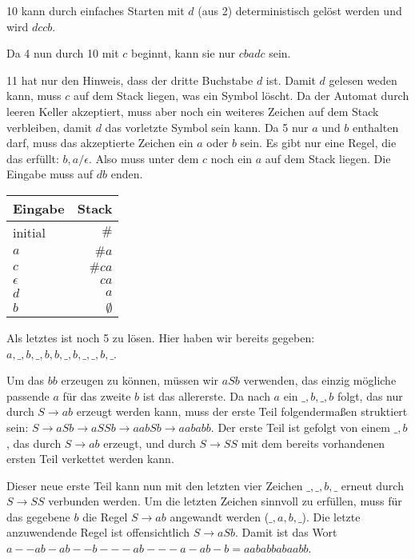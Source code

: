\documentclass{article}
\begin{document}
\bigskip

10 kann durch einfaches Starten mit $d$ (aus 2) deterministisch gelöst werden und wird $dccb$.

\bigskip

Da 4 nun durch 10 mit $c$ beginnt, kann sie nur $cbadc$ sein.

\bigskip

11 hat nur den Hinweis, dass der dritte Buchstabe $d$ ist. Damit $d$ gelesen weden kann, muss $c$ auf dem Stack liegen, was ein Symbol löscht. Da der Automat durch leeren Keller akzeptiert, muss aber noch ein weiteres Zeichen auf dem Stack verbleiben, damit $d$ das vorletzte Symbol sein kann. Da 5 nur $a$ und $b$ enthalten darf, muss das akzeptierte Zeichen ein $a$ oder $b$ sein. Es gibt nur eine Regel, die das erfüllt: $b,a/\epsilon$. Also muss unter dem $c$ noch ein $a$ auf dem Stack liegen. Die Eingabe muss auf $db$ enden.

\begin{table*}[h]
	\centering
		\begin{tabular}{l|r}
      Eingabe & Stack \\
      \hline
      initial & $\#$ \\
      $a$ & $\# a$ \\
      $c$ & $\# ca$ \\
      $\epsilon$ & $ca$ \\
      $d$ & $a$ \\
      $b$ & $\emptyset$
		\end{tabular}
\end{table*}

\bigskip

Als letztes ist noch 5 zu lösen. Hier haben wir bereits gegeben: \\ $a,\_,b,\_,b,b,\_,b,\_,\_,b,\_$. 

Um das $bb$ erzeugen zu können, müssen wir $aSb$ verwenden, das einzig mögliche passende $a$ für das zweite $b$ ist das allererste. Da nach $a$ ein $\_,b,\_,b$ folgt, das nur durch $S\rightarrow ab$ erzeugt werden kann, muss der erste Teil folgendermaßen struktiert sein: $S \rightarrow aSb \rightarrow aSSb \rightarrow aabSb \rightarrow aababb$.
Der erste Teil ist gefolgt von einem $\_,b$, das durch $S \rightarrow ab$ erzeugt, und durch $S \rightarrow SS$ mit dem bereits vorhandenen ersten Teil verkettet werden kann.

Dieser neue erste Teil kann nun mit den letzten vier Zeichen $\_,\_,b,\_$ erneut durch $S \rightarrow SS$ verbunden werden. Um die letzten Zeichen sinnvoll zu erfüllen, muss für das gegebene $b$ die Regel $S \rightarrow ab$ angewandt werden ($\_,a,b,\_$). Die letzte anzuwendende Regel ist offensichtlich $S \rightarrow aSb$. Damit ist das Wort \linebreak $a--ab-ab--b---ab---a-ab-b = aababbabaabb$.
\end{document}
